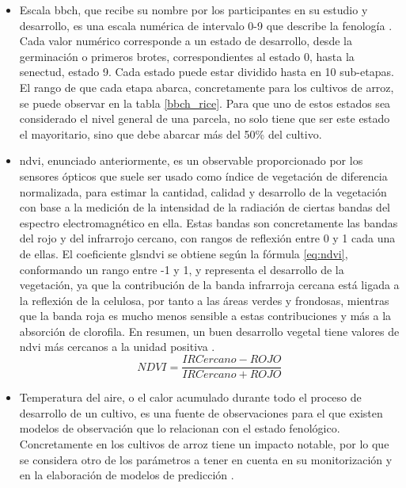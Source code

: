 \begin{itemize}
	\item Escala \gls{bbch}, que recibe su nombre por los participantes en su estudio y desarrollo, es una escala numérica de intervalo 0-9 que describe la fenología \cite{bbch}. Cada valor numérico corresponde a un estado de desarrollo, desde la germinación o primeros brotes, correspondientes al estado 0, hasta la senectud, estado 9. Cada estado puede estar dividido hasta en 10 sub-etapas. El rango de que cada etapa abarca, concretamente para los cultivos de arroz, se puede observar en la tabla \ref{bbch_rice}. Para que uno de estos estados sea considerado el nivel general de una parcela, no solo tiene que ser este estado el mayoritario, sino que debe abarcar más del 50\% del cultivo. 
	\item \gls{ndvi}, enunciado anteriormente, es un observable proporcionado por los sensores ópticos que suele ser usado como índice de vegetación de diferencia normalizada, para estimar la cantidad, calidad y desarrollo de la vegetación con base a la medición de la intensidad de la radiación de ciertas bandas del espectro electromagnético en ella. Estas bandas son concretamente las bandas del rojo y del infrarrojo cercano, con rangos de  reflexión entre 0 y 1 cada una de ellas. El coeficiente gls{ndvi} se obtiene según la fórmula \ref{eq:ndvi}, conformando un rango entre -1 y 1, y representa el desarrollo de la vegetación, ya que la contribución de la banda infrarroja cercana está ligada a la reflexión de la celulosa, por tanto a las áreas verdes y frondosas, mientras que la banda roja es mucho menos sensible a estas contribuciones y más a la absorción de clorofila. En resumen, un buen desarrollo vegetal tiene valores de \gls{ndvi} más cercanos a la unidad positiva \citep{ndvi}. 
	\begin{equation} \label{eq:ndvi}
		NDVI = \frac{IRCercano-ROJO}{IRCercano+ROJO}
	\end{equation}
	\item Temperatura del aire, o el calor acumulado durante todo el proceso de desarrollo de un cultivo, es una fuente de observaciones para el que existen modelos de observación que lo relacionan con el estado fenológico. Concretamente en los cultivos de arroz tiene un impacto notable, por lo que se considera otro de los parámetros a tener en cuenta en su monitorización y en la elaboración de modelos de predicción \cite{Juanma2016}.
\end{itemize} 

